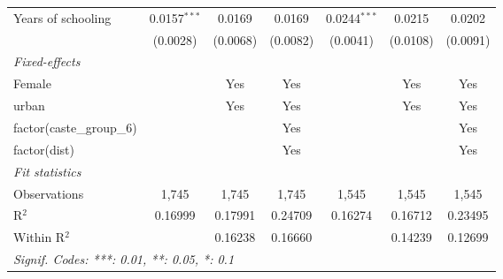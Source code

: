 \begin{table}[htbp]
\begin{adjustbox}{width = \textwidth, center}
\begin{tabular}{lcccccc}
         Years of schooling        & 0.0157$^{***}$          & 0.0169         & 0.0169       & 0.0244$^{***}$  & 0.0215                 & 0.0202\\   
                                   & (0.0028)                & (0.0068)       & (0.0082)     & (0.0041)        & (0.0108)               & (0.0091)\\   
         \midrule
         \emph{Fixed-effects}\\
         Female                    &                         & Yes            & Yes          &                 & Yes                    & Yes\\  
         urban                     &                         & Yes            & Yes          &                 & Yes                    & Yes\\  
         factor(caste\_group\_6)   &                         &                & Yes          &                 &                        & Yes\\  
         factor(dist)              &                         &                & Yes          &                 &                        & Yes\\  
         \midrule
         \emph{Fit statistics}\\
         Observations              & 1,745                   & 1,745          & 1,745        & 1,545           & 1,545                  & 1,545\\  
         R$^2$                     & 0.16999                 & 0.17991        & 0.24709      & 0.16274         & 0.16712                & 0.23495\\  
         Within R$^2$              &                         & 0.16238        & 0.16660      &                 & 0.14239                & 0.12699\\  
         \midrule \midrule
         \multicolumn{7}{l}{\emph{Signif. Codes: ***: 0.01, **: 0.05, *: 0.1}}\\
      \end{tabular}
   \end{adjustbox}
\end{table}


